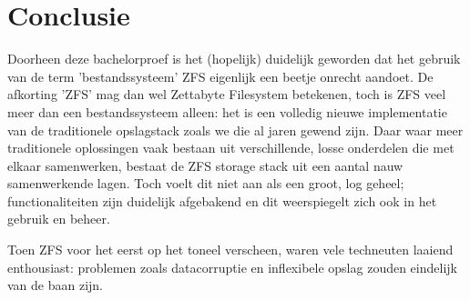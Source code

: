 
\chapter{Conclusie}
\label{ch:conclusie}



Doorheen deze bachelorproef is het (hopelijk) duidelijk geworden dat het gebruik van de term 'bestandssysteem' ZFS eigenlijk een beetje onrecht aandoet. De afkorting 'ZFS' mag dan wel Zettabyte Filesystem betekenen, toch is ZFS veel meer dan een bestandssysteem alleen: het is een volledig nieuwe implementatie van de traditionele opslagstack zoals we die al jaren gewend zijn. Daar waar meer traditionele oplossingen vaak bestaan uit verschillende, losse onderdelen die met elkaar samenwerken, bestaat de ZFS storage stack uit een aantal nauw samenwerkende lagen. Toch voelt dit niet aan als een groot, log geheel; functionaliteiten zijn duidelijk afgebakend en dit weerspiegelt zich ook in het gebruik en beheer.   

Toen ZFS voor het eerst op het toneel verscheen, waren vele techneuten laaiend enthousiast: problemen zoals datacorruptie en inflexibele opslag zouden eindelijk van de baan zijn.  
